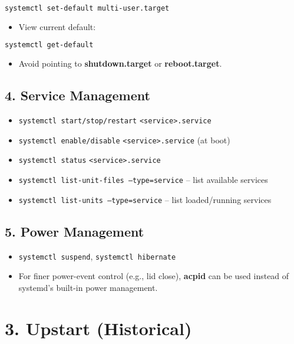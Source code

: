\documentclass[12pt,a4paper]{report}
\begin{document}
\begin{lstlisting}[language=bash]
systemctl set-default multi-user.target
\end{lstlisting}

\begin{itemize}
    \item View current default:
\end{itemize}

\begin{lstlisting}[language=bash]
systemctl get-default
\end{lstlisting}

\begin{itemize}
    \item Avoid pointing to \textbf{shutdown.target} or \textbf{reboot.target}.
\end{itemize}

\subsection*{4. Service Management}
\begin{itemize}
    \item \texttt{systemctl start/stop/restart} \texttt{<service>.service}
    \item \texttt{systemctl enable/disable} \texttt{<service>.service} (at boot)
    \item \texttt{systemctl status} \texttt{<service>.service}
    \item \texttt{systemctl list-unit-files --type=service} – list available services
    \item \texttt{systemctl list-units --type=service} – list loaded/running services
\end{itemize}

\subsection*{5. Power Management}
\begin{itemize}
    \item \texttt{systemctl suspend}, \texttt{systemctl hibernate}
    \item For finer power-event control (e.g., lid close), \textbf{acpid} can be used instead of systemd’s built-in power management.
\end{itemize}

\section*{3. Upstart (Historical)}
\end{document}
